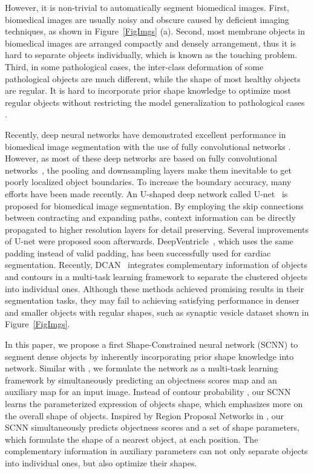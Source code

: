 However, it is non-trivial to automatically segment biomedical images.
First, biomedical images are usually noisy and obscure caused by deficient imaging techniques, as shown in Figure~\ref{FigImgs} (a).
Second, most membrane objects in biomedical images are arranged compactly and densely arrangement, thus it is hard to separate objects individually, which is known as the touching problem.
Third, in some pathological cases, the inter-class deformation of some pathological objects are much different, while the shape of most healthy objects are regular.
It is hard to incorporate prior shape knowledge to optimize most regular objects without restricting the model generalization to pathological cases \cite{Sirinukunwattana2015b}.

Recently, deep neural networks have demonstrated excellent performance in biomedical image segmentation with the use of fully convolutional networks \cite{Dhungel2015,Ronneberger2015,Roth2015,Chen2015,Lieman-Sifry2017,Xu2016,Chen2016b}.
However, as most of these deep networks are based on fully convolutional networks~\cite{Long2015}, the pooling and downsampling layers make them inevitable to get poorly localized object boundaries.
To increase the boundary accuracy, many efforts have been made recently. An U-shaped deep network called U-net~\cite{Ronneberger2015} is proposed for biomedical image segmentation. 
By employing the skip connections between contracting and expanding paths, context information can be directly propagated to higher resolution layers for detail preserving.
Several improvements of U-net were proposed soon afterwards.
DeepVentricle~\cite{Lieman-Sifry2017}, which uses the same padding instead of valid padding, has been successfully used for cardiac segmentation.
Recently, DCAN~\cite{Chen2016a} integrates complementary information of objects and contours in a multi-task learning framework to separate the clustered objects into individual ones.
Although these methods achieved promising results in their segmentation tasks, they may fail to achieving satisfying performance in denser and smaller objects with regular shapes, such as synaptic vesicle dataset shown in Figure~\ref{FigImgs}.

In this paper, we propose a first Shape-Constrained neural network (SCNN) to segment dense objects by inherently incorporating prior shape knowledge into network.
Similar with \cite{Chen2016a}, we formulate the network as a multi-task learning framework by simultaneously predicting an objectness scores map and an auxiliary map for an input image.
Instead of contour probability \cite{Chen2016a,Chen2016,Bertasius2016}, our SCNN learns the parameterized expression of objects shape, which emphasizes more on the overall shape of objects.
Inspired by Region Proposal Networks in \cite{Ren2015}, our SCNN simultaneously predicts objectness scores and a set of shape parameters, which formulate the shape of a nearest object, at each position.
The complementary information in auxiliary parameters can not only separate objects into individual ones, but also optimize their shapes.

